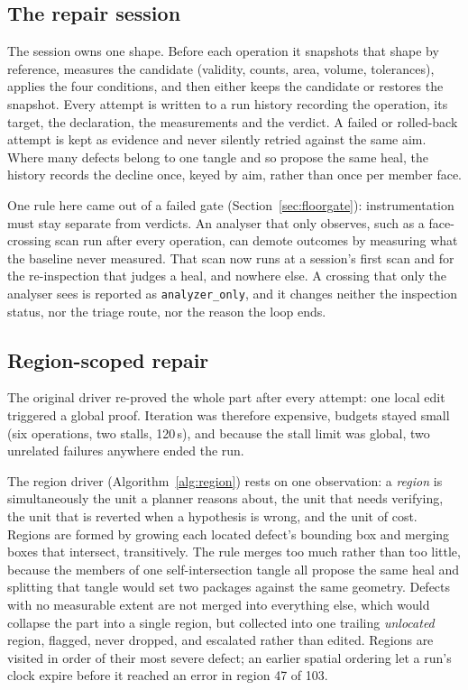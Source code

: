 \documentclass[10pt,onecolumn]{article}
\newcommand{\code}[1]{\texttt{\small #1}}
\begin{document}
\subsection{The repair session}\label{sec:session}

The session owns one shape. Before each operation it snapshots that shape by reference, measures the
candidate (validity, counts, area, volume, tolerances), applies the four conditions, and then either
keeps the candidate or restores the snapshot. Every attempt is written to a run history recording
the operation, its target, the declaration, the measurements and the verdict. A failed or
rolled-back attempt is kept as evidence and never silently retried against the same aim. Where many
defects belong to one tangle and so propose the same heal, the history records the decline once,
keyed by aim, rather than once per member face.

One rule here came out of a failed gate (Section~\ref{sec:floorgate}): instrumentation must stay
separate from verdicts. An analyser that only observes, such as a face-crossing scan run after every
operation, can demote outcomes by measuring what the baseline never measured. That scan now
runs at a session's first scan and for the re-inspection that judges a heal, and nowhere else. A
crossing that only the analyser sees is reported as \code{analyzer\_only}, and it changes neither
the inspection status, nor the triage route, nor the reason the loop ends.

\subsection{Region-scoped repair}\label{sec:regions}

The original driver re-proved the whole part after every attempt: one local edit triggered a global
proof. Iteration was therefore expensive, budgets stayed small (six operations, two stalls, 120\,s),
and because the stall limit was global, two unrelated failures anywhere ended the run.

The region driver (Algorithm~\ref{alg:region}) rests on one observation: a \emph{region} is
simultaneously the unit a planner reasons about, the unit that needs verifying, the unit that is
reverted when a hypothesis is wrong, and the unit of cost. Regions are formed by growing each
located defect's bounding box and merging boxes that intersect, transitively. The rule merges too
much rather than too little, because the members of one self-intersection tangle all propose the
same heal and splitting that tangle would set two packages against the same geometry. Defects with
no measurable extent are not merged into everything else, which would collapse the part into a
single region, but collected into one trailing \emph{unlocated} region, flagged, never dropped,
and escalated rather than edited. Regions are visited in order of their most severe defect; an
earlier spatial ordering let a run's clock expire before it reached an error in region 47 of 103.
\end{document}
